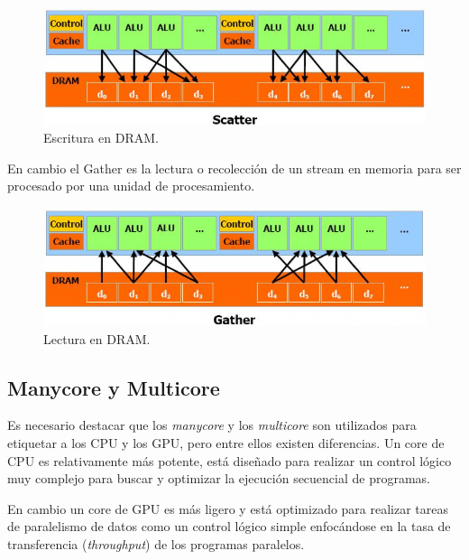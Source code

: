 \begin{itemize}
        \begin{figure}[ht]
      \centering
        \includegraphics[scale=1]{img/scatter}
        \caption{Escritura en DRAM\cite{NCUDA}.}
        \label{fig:scatter}
    \end{figure}
   
En cambio el Gather es la lectura o recolección de un stream en memoria para ser procesado por una unidad de procesamiento.

        \begin{figure}[ht]
      \centering
        \includegraphics[scale=1]{img/gather}
        \caption{Lectura en DRAM\cite{NCUDA}.}
        \label{fig:gather}
    \end{figure}

\end{itemize} 
    \subsection{Manycore y Multicore}
    Es necesario destacar que los \textit{manycore} y los \textit{multicore} son utilizados para etiquetar a los CPU y los GPU, pero entre ellos existen diferencias. Un core de CPU es relativamente más potente, está diseñado para realizar un control lógico muy complejo para buscar y optimizar la ejecución secuencial de programas.
   
    \vspace{0.3cm}
    En cambio un core de GPU es más ligero y está optimizado para realizar tareas de paralelismo de datos como un control lógico simple enfocándose en la tasa de transferencia (\textit{throughput}) de los programas paralelos.
    
